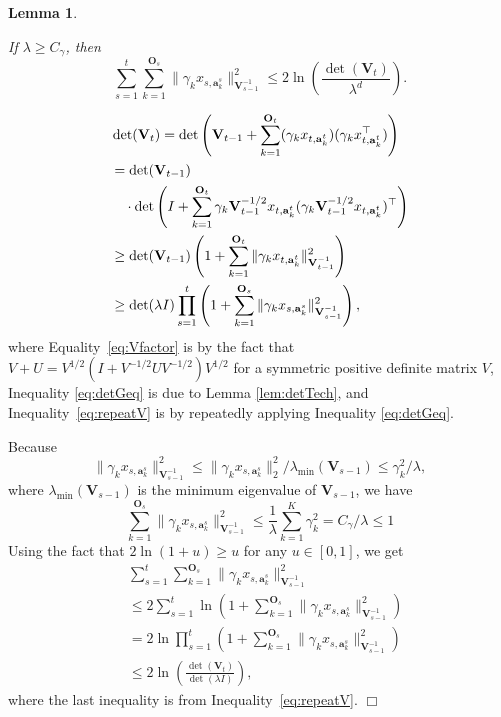 \documentclass{article}
\newcommand{\ba}{\mathbf{a}}
\newcommand{\bO}{\mathbf{O}}
\newcommand{\bV}{\mathbf{V}}
\newcommand{\norm}[1]{\| #1 \|}
\newtheorem{lemma}[theorem]{Lemma}%
\newenvironment{proof}{\noindent {\textbf{Proof. }}}{$\Box$ \medskip}
\newcommand{\CLemmaSumXiEstimateInDet}{
  If $\lambda \geq C_\gamma$, then
  $$
    \sum_{s=1}^t \sum_{k=1}^{\bO_s} \norm{\gamma_k x_{s,\ba_{k}^s}}_{\bV_{s-1}^{-1}}^2 \leq 2\ln \left(\frac{\det(\bV_t)}{\lambda^d} \right).
  $$
}
\begin{document}
\begin{lemma} %
  \label{lem:SumXiEstimateInDet}
  \CLemmaSumXiEstimateInDet
\end{lemma}
\begin{proof}
	\begin{align}
	&\det(\bV_t) = \det\left(\bV_{t-1} + \sum_{k=1}^{\bO_t} (\gamma_k x_{t,\ba_k^{t}})(\gamma_k x_{t, \ba_k^{t}}^{\top}) \right) \nonumber \\
	&=\det(\bV_{t-1}) \notag \\
	&~~~\cdot \det \left(I + \sum_{k=1}^{\bO_t} \gamma_k \bV_{t-1}^{-1/2}x_{t,\ba_{k}^{t}} (\gamma_k \bV_{t-1}^{-1/2}x_{t,\ba_{k}^{t}})^{\top} \right) \label{eq:Vfactor}\\
	&\geq \det(\bV_{t-1}) \left(1 + \sum_{k=1}^{\bO_t} \norm{\gamma_k x_{t,\ba_k^t}}_{\bV_{t-1}^{-1}}^2 \right) \label{eq:detGeq} \\
	&\geq \det(\lambda I)\prod_{s=1}^{t} \left(1 + \sum_{k=1}^{\bO_s} \norm{\gamma_k x_{s,\ba_k^s}}_{\bV_{s-1}^{-1}}^2 \right), \label{eq:repeatV}
	\end{align}
	where Equality~\eqref{eq:Vfactor} is by the fact that $V+U = V^{1/2} (I + V^{-1/2} U V^{-1/2}) V^{1/2}$ for a symmetric positive definite matrix $V$, Inequality \eqref{eq:detGeq} is due to Lemma \ref{lem:detTech}, and Inequality~\eqref{eq:repeatV} is by repeatedly applying Inequality \eqref{eq:detGeq}.
	
	Because
	$$
	\norm{\gamma_k x_{s,\ba_k^s}}_{\bV_{s-1}^{-1}}^2 \leq \norm{\gamma_k x_{s,\ba_k^s}}_2^2/\lambda_{\min}(\bV_{s-1}) \leq \gamma_k^2 /\lambda,
	$$
	where $\lambda_{\min}(\bV_{s-1})$ is the minimum eigenvalue of $\bV_{s-1}$,  we have 
	$$
	\sum_{k=1}^{\bO_s} \norm{\gamma_k x_{s,\ba_k^s}}_{\bV_{s-1}^{-1}}^2 \leq \frac{1}{\lambda} \sum_{k=1}^{K} \gamma_k^2 = C_\gamma /\lambda \leq 1
	$$
	Using the fact that $ 2\ln(1+u) \geq u$ for any $u \in [0,1]$, we get
	\begin{align*}
	&\sum_{s=1}^t \sum_{k=1}^{\bO_s}\norm{\gamma_k x_{s,\ba_{k}^s}}_{\bV_{s-1}^{-1}}^2 \\
	&\leq 2\sum_{s=1}^t\ln \left(1 + \sum_{k=1}^{\bO_s} \norm{\gamma_k x_{s,\ba_k^s}}_{\bV_{s-1}^{-1}}^2 \right)\\
	& = 2 \ln \prod_{s=1}^{t} \left(1 + \sum_{k=1}^{\bO_s} \norm{\gamma_k x_{s,\ba_k^s}}_{\bV_{s-1}^{-1}}^2 \right) \\
	&\le 2 \ln \left(\frac{\det(\bV_t)}{\det(\lambda I)} \right),
	\end{align*}
	where the last inequality is from Inequality~\eqref{eq:repeatV}.
\end{proof}
\end{document}
